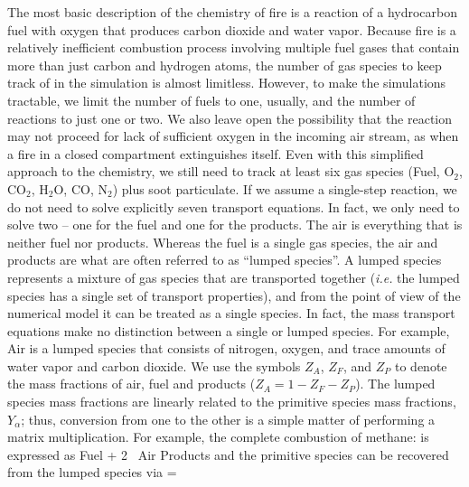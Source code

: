 The most basic description of the chemistry of fire is a reaction of a hydrocarbon fuel with oxygen that produces carbon dioxide and water vapor. Because fire is a relatively
inefficient combustion process involving multiple fuel gases that contain more than just carbon and hydrogen atoms, the number of gas species to keep track of in the simulation
is almost limitless. However, to make the simulations tractable, we limit the number of fuels to one, usually, and the number of reactions to just one or two. We also leave open
the possibility that the reaction may not proceed for lack of sufficient oxygen in the incoming air stream, as when a fire in a closed compartment extinguishes itself. Even
with this simplified approach to the chemistry, we still need to track at least six gas species (Fuel, O$_2$, CO$_2$, H$_2$O, CO, N$_2$) plus soot particulate. If we assume a single-step
reaction, we do not need
to solve explicitly seven transport equations. In fact, we only need to solve two -- one for the fuel and one for the products. The air is everything that is neither fuel nor
products. Whereas the fuel is a single gas species, the air and products are what are often referred to as ``lumped species''.  
A lumped species represents a mixture of gas species that are transported together ({\em i.e.} the lumped species has a single set of transport properties), and from the point of
view of the numerical model it can be treated as a single species. In fact, the mass transport equations make no distinction between a single or lumped species. For example, Air is a
lumped species that consists of nitrogen, oxygen, and trace amounts of water vapor and carbon dioxide. 
We use the symbols $Z_A$, $Z_F$, and $Z_P$ to denote the mass fractions of air, fuel and products ($Z_A=1 - Z_F - Z_P$).  The lumped species mass fractions are linearly related
to the primitive species mass fractions, $Y_\alpha$; thus, conversion from one to the other is a simple matter of performing a matrix multiplication.  For example, the complete
combustion of methane:
\be {} \ee
is expressed as
\be \hbox{Fuel} + 2 \, \hbox{Air} \rightarrow \hbox{Products} \ee
and the primitive species can be recovered from the lumped species via
\be \left[ \begin{array} {c c c}
0.77 & 0.00 & 0.73 \\
0.23 & 0.00 & 0.00 \\
0.00 & 1.00 & 0.00 \\
0.00 & 0.00 & 0.15 \\
0.00 & 0.00 & 0.12  \end{array}
\right]
\left[ \begin{array} {c} Z_A \\ Z_F \\ Z_P \end{array} \right] =
 \ee

